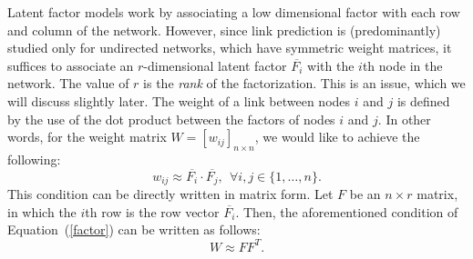 \documentclass[10pt,journal,compsoc]{IEEEtran}
\begin{document}
Latent factor models work by associating a low dimensional factor
with each row and column of the network. However, since link
prediction is (predominantly) studied only for undirected networks,
which have symmetric weight matrices, it suffices to associate an
$r$-dimensional latent factor $\overline{F_i}$ with the $i$th node
in the network. The value of $r$ is the {\em rank} of the
factorization. This is an issue, which we will discuss slightly
later.  The weight of a link between nodes $i$ and $j$ is defined by
the use of the dot product between the factors of nodes $i$ and $j$.
In other words, for the weight matrix $W= [w_{ij}]_{n\times n}$, we
would like to achieve the following:
\begin{equation}
w_{ij} \approx \overline{F_i} \cdot \overline{F_j}, \ \ \forall i, j
\in \{ 1, \ldots, n \} \label{factor}.
\end{equation}
This condition can be directly written in matrix form. Let $F$ be an
$n \times r$ matrix, in which the $i$th row is the row vector
$\overline{F_i}$. Then, the aforementioned condition of
Equation~(\ref{factor}) can be written as follows:
\begin{equation}
W \approx F F^T.
\end{equation}


\end{document}
